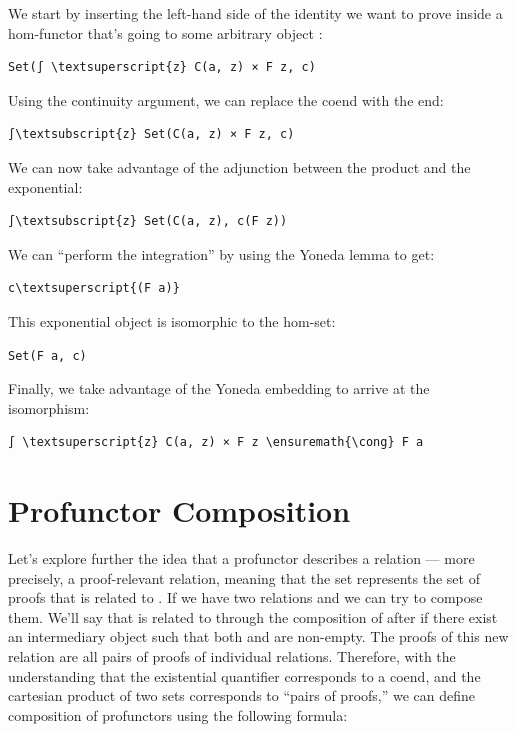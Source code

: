 We start by inserting the left-hand side of the identity we want to
prove inside a hom-functor that's going to some arbitrary object
:

\begin{Verbatim}[commandchars=\\\{\}]
Set(∫ \textsuperscript{z} C(a, z) × F z, c)
\end{Verbatim}
Using the continuity argument, we can replace the coend with the end:

\begin{Verbatim}[commandchars=\\\{\}]
∫\textsubscript{z} Set(C(a, z) × F z, c)
\end{Verbatim}
We can now take advantage of the adjunction between the product and the
exponential:

\begin{Verbatim}[commandchars=\\\{\}]
∫\textsubscript{z} Set(C(a, z), c(F z))
\end{Verbatim}
We can ``perform the integration'' by using the Yoneda lemma to get:

\begin{Verbatim}[commandchars=\\\{\}]
c\textsuperscript{(F a)}
\end{Verbatim}
This exponential object is isomorphic to the hom-set:

\begin{Verbatim}[commandchars=\\\{\}]
Set(F a, c)
\end{Verbatim}
Finally, we take advantage of the Yoneda embedding to arrive at the
isomorphism:

\begin{Verbatim}[commandchars=\\\{\}]
∫ \textsuperscript{z} C(a, z) × F z \ensuremath{\cong} F a
\end{Verbatim}

\section{Profunctor Composition}\label{profunctor-composition}

Let's explore further the idea that a profunctor describes a relation
--- more precisely, a proof-relevant relation, meaning that the set
 represents the set of proofs that  is related
to . If we have two relations  and  we can
try to compose them. We'll say that  is related to 
through the composition of  after  if there exist an
intermediary object  such that both  and
 are non-empty. The proofs of this new relation are all
pairs of proofs of individual relations. Therefore, with the
understanding that the existential quantifier corresponds to a coend,
and the cartesian product of two sets corresponds to ``pairs of
proofs,'' we can define composition of profunctors using the following
formula:

